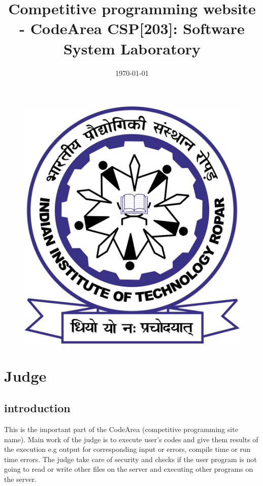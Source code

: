 \documentclass{article}
\title{Competitive programming website - CodeArea
        CSP[203]: Software System Laboratory}
\date{\today}
\begin{document}
\maketitle

\begin{table}[h!]
    \begin{center}
    \end{center}
\end{table}

\vspace{2cm}

\begin{figure}[h!]
    \centering
    \includegraphics[width=0.4\linewidth]{rpr_logo.jpg}
\end{figure}





\newpage

\section{Judge}

\subsection{introduction}
This is the important part of the CodeArea (competitive programming site name).
Main work of the judge is to execute user's codes and give them results of the execution e.g output for corresponding input or errors, compile time or run time errors. The judge take care of security and checks if the user program is not going to read or write other files on the server and executing other programs on the server.
\end{document}
